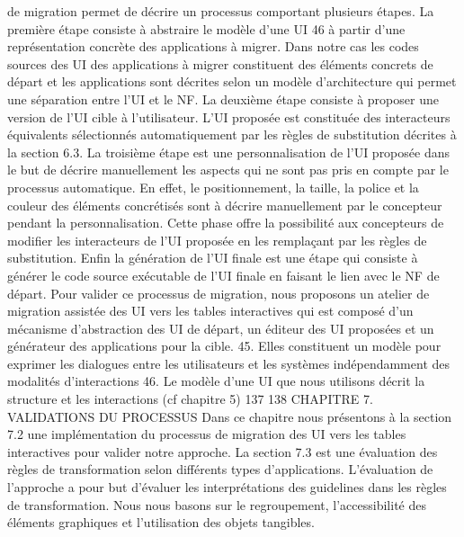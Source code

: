 \documentclass{article}
\begin{document}
de migration permet de d\'{e}crire un processus comportant plusieurs \'{e}tapes.
La premi\`{e}re \'{e}tape consiste \`{a} abstraire le mod\`{e}le d’une UI 46 \`{a} partir d’une repr\'{e}sentation
concr\`{e}te des applications \`{a} migrer. Dans notre cas les codes sources des UI des applications \`{a} migrer constituent des \'{e}l\'{e}ments concrets de d\'{e}part et les applications sont d\'{e}crites selon un mod\`{e}le
d’architecture qui permet une s\'{e}paration entre l’UI et le NF. La deuxi\`{e}me \'{e}tape consiste \`{a} proposer
une version de l’UI cible \`{a} l’utilisateur. L’UI propos\'{e}e est constitu\'{e}e des interacteurs \'{e}quivalents s\'{e}lectionn\'{e}s automatiquement par les r\`{e}gles de substitution d\'{e}crites \`{a} la section 6.3. La troisi\`{e}me \'{e}tape
est une personnalisation de l’UI propos\'{e}e dans le but de d\'{e}crire manuellement les aspects qui ne sont
pas pris en compte par le processus automatique. En effet, le positionnement, la taille, la police et la
couleur des \'{e}l\'{e}ments concr\'{e}tis\'{e}s sont \`{a} d\'{e}crire manuellement par le concepteur pendant la personnalisation. Cette phase offre la possibilit\'{e} aux concepteurs de modiﬁer les interacteurs de l’UI propos\'{e}e
en les rempla\c{c}ant par les r\`{e}gles de substitution. Enﬁn la g\'{e}n\'{e}ration de l’UI ﬁnale est une \'{e}tape qui
consiste \`{a} g\'{e}n\'{e}rer le code source ex\'{e}cutable de l’UI ﬁnale en faisant le lien avec le NF de d\'{e}part.
Pour valider ce processus de migration, nous proposons un atelier de migration assist\'{e}e des UI
vers les tables interactives qui est compos\'{e} d’un m\'{e}canisme d’abstraction des UI de d\'{e}part, un \'{e}diteur
des UI propos\'{e}es et un g\'{e}n\'{e}rateur des applications pour la cible.
45. Elles constituent un mod\`{e}le pour exprimer les dialogues entre les utilisateurs et les syst\`{e}mes ind\'{e}pendamment des
modalit\'{e}s d’interactions
46. Le mod\`{e}le d’une UI que nous utilisons d\'{e}crit la structure et les interactions (cf chapitre 5)
137
138
CHAPITRE 7. VALIDATIONS DU PROCESSUS
Dans ce chapitre nous pr\'{e}sentons \`{a} la section 7.2 une impl\'{e}mentation du processus de migration
des UI vers les tables interactives pour valider notre approche. La section 7.3 est une \'{e}valuation des
r\`{e}gles de transformation selon diff\'{e}rents types d’applications. L’\'{e}valuation de l’approche a pour but
d’\'{e}valuer les interpr\'{e}tations des guidelines dans les r\`{e}gles de transformation. Nous nous basons sur le
regroupement, l’accessibilit\'{e} des \'{e}l\'{e}ments graphiques et l’utilisation des objets tangibles.
\end{document}
